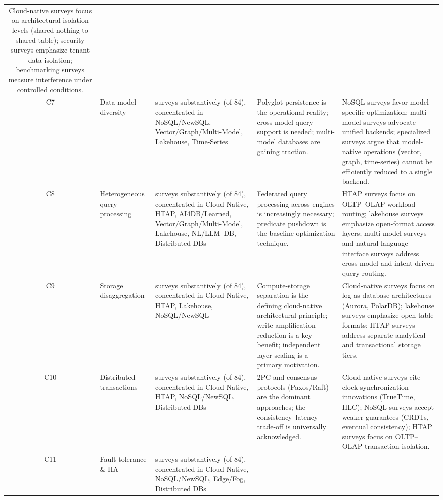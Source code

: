 \documentclass[a4paper,fleqn]{cas-sc}
\begin{document}
\begin{landscape}
\begin{small}
\begin{longtable}{c >{\raggedright\arraybackslash}p{2.2cm} >{\raggedright\arraybackslash}p{2.5cm} >{\raggedright\arraybackslash}p{7.2cm} >{\raggedright\arraybackslash}p{7.2cm}}
Cloud-native surveys focus on architectural isolation levels (shared-nothing to shared-table); security surveys emphasize tenant data isolation; benchmarking surveys measure interference under controlled conditions. \\
\addlinespace
C7 & Data model diversity &
44 surveys substantively (of 84), concentrated in NoSQL/NewSQL, Vector/Graph/Multi-Model, Lakehouse, Time-Series &
Polyglot persistence is the operational reality; cross-model query support is needed; multi-model databases are gaining traction. &
NoSQL surveys favor model-specific optimization; multi-model surveys advocate unified backends; specialized surveys argue that model-native operations (vector, graph, time-series) cannot be efficiently reduced to a single backend. \\
\addlinespace
C8 & Heterogeneous query processing &
19 surveys substantively (of 84), concentrated in Cloud-Native, HTAP, AI4DB/Learned, Vector/Graph/Multi-Model, Lakehouse, NL/LLM--DB, Distributed DBs &
Federated query processing across engines is increasingly necessary; predicate pushdown is the baseline optimization technique. &
HTAP surveys focus on OLTP--OLAP workload routing; lakehouse surveys emphasize open-format access layers; multi-model surveys and natural-language interface surveys address cross-model and intent-driven query routing. \\
\addlinespace
C9 & Storage disaggregation &
19 surveys substantively (of 84), concentrated in Cloud-Native, HTAP, Lakehouse, NoSQL/NewSQL &
Compute-storage separation is the defining cloud-native architectural principle; write amplification reduction is a key benefit; independent layer scaling is a primary motivation. &
Cloud-native surveys focus on log-as-database architectures (Aurora, PolarDB); lakehouse surveys emphasize open table formats; HTAP surveys address separate analytical and transactional storage tiers. \\
\addlinespace
C10 & Distributed transactions &
27 surveys substantively (of 84), concentrated in Cloud-Native, HTAP, NoSQL/NewSQL, Distributed DBs &
2PC and consensus protocols (Paxos/Raft) are the dominant approaches; the consistency--latency trade-off is universally acknowledged. &
Cloud-native surveys cite clock synchronization innovations (TrueTime, HLC); NoSQL surveys accept weaker guarantees (CRDTs, eventual consistency); HTAP surveys focus on OLTP--OLAP transaction isolation. \\
\addlinespace
C11 & Fault tolerance \& HA &
30 surveys substantively (of 84), concentrated in Cloud-Native, NoSQL/NewSQL, Edge/Fog, Distributed DBs &

\end{longtable}
\end{small}
\end{landscape}
\end{document}

